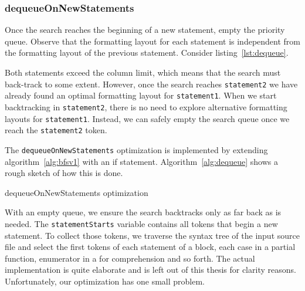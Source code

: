 \subsubsection{dequeueOnNewStatements}\label{sec:dequeue}
Once the search reaches the beginning of a new statement, empty the priority queue.
Observe that the formatting layout for each statement is independent from the formatting layout of the previous statement.
Consider listing~\ref{lst:dequeue}.

Both statements exceed the column limit, which means that the search must back-track to some extent.
However, once the search reaches \texttt{statement2} we have already found an optimal formatting layout for \texttt{statement1}.
When we start backtracking in \texttt{statement2}, there is no need to explore alternative formatting layouts for \texttt{statement1}.
Instead, we can safely empty the search queue once we reach the \texttt{statement2} token.

The \texttt{dequeueOnNewStatements} optimization is implemented by extending algorithm~\ref{alg:bfsv1} with an if statement.
Algorithm~\ref{alg:dequeue} shows a rough sketch of how this is done.
\begin{algorithm}
\caption{dequeueOnNewStatements optimization}\label{alg:dequeue}
  
\end{algorithm}
With an empty queue, we ensure the search backtracks only as far back as is needed.
The \texttt{statementStarts} variable contains all tokens that begin a new statement.
To collect those tokens, we traverse the syntax tree of the input source file and select the first tokens of each statement of a block, each case in a partial function, enumerator in a for comprehension and so forth.
The actual implementation is quite elaborate and is left out of this thesis for clarity reasons.
Unfortunately, our optimization has one small problem.

